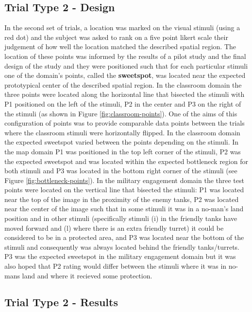 \documentclass[11pt,letterpaper]{article}
\begin{document}
\subsection{Trial Type 2 - Design} 
In the second set of trials, a location was marked on the visual stimuli (using a red dot) and the subject was asked to rank on a five point likert scale their judgement of how well the location matched the described spatial region.  The location of these points was informed by the results of a pilot study and the final design of the study and they were positioned such that for each particular stimuli one of the domain's points, called the \textbf{sweetspot}, was located near the expected prototypical center of the described spatial region. In the classroom domain the three points were located along the horizontal line that bisected the stimuli with P1 positioned on the left of the stimuli, P2 in the center and P3 on the right of the stimuli (as shown in Figure \ref{fig:classroom-points}). One of the aims of this configuration of points was to provide comparable data points between the trials where the classroom stimuli were horizontally flipped. In the classroom domain the expected sweetspot varied between the points depending on the stimuli. In the map domain P1 was positioned in the top left corner of the stimuli,  P2 was the expected sweetspot and was located within the expected bottleneck region for both stimuli and P3 was located in the bottom right corner of the stimuli (see Figure \ref{fig:bottleneck-points}).  In the military engagement domain the three test points were located on the vertical line that bisected the stimuli: P1 was located near the top of the image in the proximity of the enemy tanks, P2 was located near the center of the image such that in some stimuli it was in a no-man's land position and in other stimuli (specifically stimuli (i) in the friendly tanks have moved forward and (l) where there is an extra friendly turret) it could be considered to be in a protected area, and P3 was located near the bottom of the stimuli and consequently was always located behind the friendly tanks/turrets. P3 was the expected sweetspot in the military engagement domain but it was also hoped that P2 rating would differ between the stimuli where it was in no-mans land and where it recieved some protection. 

\subsection{Trial Type 2 - Results}
\end{document}
